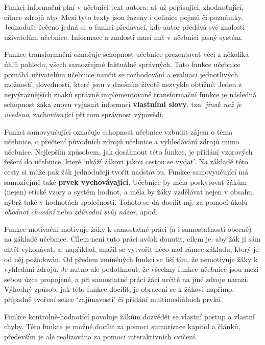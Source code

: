 \documentclass[12pt]{article}
\begin{document}
Funkci informační plní v učebnici text autora: ať už popisující, zhodnoťující, citace zdrojů atp. Mezi tyto texty jsou řazeny i definice pojmů či poznámky.  Jednoduše řečeno jedná se o funkci předávací, kde autor předává své znalosti uživatelům učebnice. \cite[str. 13]{PAN2023} Informace a znalosti musí mít v učebnici jasný systém. \cite[str. 54]{PDO}

Funkce transformační označuje schopnost učebnice prezentovat věci z několika úhlů pohledu, všech samozřejmě faktuálně správných.
Tato funkce učebnice pomáhá uživatelům učebnice naučit se rozhodování a evaluaci jednotlivých možností, dovedností, které jsou v dnešním životě nezvykle obtížné. Jeden z nejvýraznějších znaků správně implementované transformační funkce je následná schopnost žáka znovu vyjasnit informaci \textbf{vlastními slovy}, tzn. \textit{jinak než je uvedeno}, zachovávající při tom správnost výpovědi. \cite[str. 15]{PAN2023}

Funkci samovyučující označuje schopnost učebnice vzbudit zájem o téma učebnice, o přečtení původních zdrojů učebnice a vyhledávání zdrojů mimo učebnice.
Nejlepším způsobem, jak dosáhnout této funkce, je přidání vzorových řešení do učebnice, které \enquote*{ukáží žákovi jakou cestou se vydat}. Na základě této cesty si může pak žák jednodušeji tvořit nadstavbu.
Funkce samovyučující má samozřejmě také \textbf{prvek vychovávající}. Učebnice by měla poskytovat žákům (nejen) etické vzory a systém hodnot, a měla by žáky vzdělávat nejen v obsahu, nýbrž také v hodnotách společnosti.
Tohoto se dá docílit mj. za pomocí úkolů \textit{ohodnoť chování} nebo \textit{zdůvodní svůj názor}, apod.
\cite[str. 16]{PAN2023} \cite[str. 55]{PDO}

Funkce motivační motivuje žáky k samostatné práci (a i samostatnosti obecně) na základě učebnice.
Cílem není tuto práci avšak donutit, cílem je, aby žák jí sám chtěl vykonávat, a, například, snažil se vytvořit něco nad rámec základu, který je od něj požadován.
Od předem zmíněných funkcí se liší tím, že nemotivuje žáky k vyhledání zdrojů.
Je nutno ale podotknout, že všechny funkce učebnice jsou mezi sebou úzce propojené, a při samostatné práci žáci určitě na jiné zdroje narazí.
Výhodný způsob, jak této funkce docílit, je obracení se k žákovi napřímo, případně tvoření sekce \enquote*{zajímavosti} či přidání multimediálních prvků.
\cite[str. 17]{PAN2023}

Funkce kontrolně-hodnotící povoluje žákům dozvědět se vlastní postup a vlastní chyby. Této funkce je možné docílit za pomoci sumarizace kapitol a článků, především je ale realizována za pomoci interaktivních cvičení.
\cite[str. 18]{PAN2023}
\end{document}
